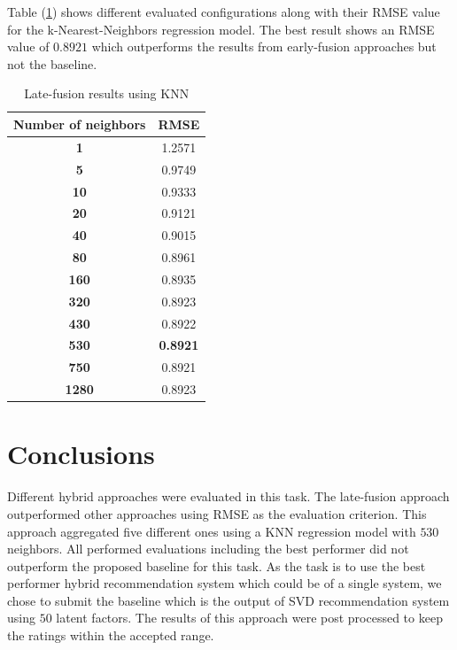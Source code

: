 \documentclass{sigish}
\begin{document}
Table (\ref{tab:late_fusion_results}) shows different evaluated configurations along with their RMSE value for the k-Nearest-Neighbors regression model. The best result shows an RMSE value of $ 0.8921 $ which outperforms the results from early-fusion approaches but not the baseline.
\begin{table}
	\centering	
	\begin{tabular}{|c|c|}
		\hline
		\textbf{Number of neighbors} & \textbf{RMSE} \\ \hline
		\textbf{1}  & 1.2571         \\ \hline
		\textbf{5} & 0.9749          \\ \hline
		\textbf{10} & 0.9333        \\ \hline
		\textbf{20} & 0.9121         \\ \hline
		\textbf{40} & 0.9015         \\ \hline
		\textbf{80} & 0.8961         \\ \hline
		\textbf{160} & 0.8935         \\ \hline
		\textbf{320} & 0.8923         \\ \hline
		\textbf{430} & 0.8922         \\ \hline
		\textbf{530} & \textbf{0.8921}			\\ \hline
		\textbf{750} & 0.8921         \\ \hline
		\textbf{1280} & 0.8923         \\ \hline
	\end{tabular}
	\caption{Late-fusion results using KNN}
	\label{tab:late_fusion_results}
\end{table}

\section{Conclusions}

Different hybrid approaches were evaluated in this task. The late-fusion approach outperformed other approaches using RMSE as the evaluation criterion. This approach aggregated five different ones using a KNN regression model with $ 530 $ neighbors.
All performed evaluations including the best performer did not outperform the proposed baseline for this task. As the task is to use the best performer hybrid recommendation system which could be of a single system, we chose to submit the baseline which is the output of SVD recommendation system using $ 50 $ latent factors. The results of this approach were post processed to keep the ratings within the accepted range.



\end{document}
